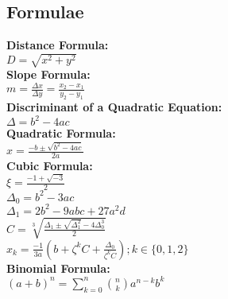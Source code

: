\documentclass[12pt]{article}
\begin{document}
\subsection*{Formulae}
\textbf{Distance Formula:}
    \\ \( D = \sqrt{ x^2 + y^2 } \)
\\ \textbf{Slope Formula:}
    \\ \( m = \displaystyle\frac{ \Delta x }{ \Delta y } = \displaystyle\frac{ x_2 - x_1 }{ y_2 - y_1 } \)
\\ \textbf{Discriminant of a Quadratic Equation:}
    \\ \( \Delta = b^2 - 4ac \)
\\ \textbf{Quadratic Formula:}
    \\ \( x = \displaystyle\frac{ -b \pm \sqrt{ b^2 - 4ac } }{ 2a } \)
\\ \textbf{Cubic Formula:}
    \\ \( \xi = \displaystyle\frac{ -1 + \sqrt{ -3 } }{ 2 } \)
    \\ \( \Delta_0 = b^2 - 3ac  \)
    \\ \( \Delta_1 = 2b^2 - 9abc + 27 a^2 d \)
    \\ \( C = \sqrt[3]{ \displaystyle\frac{ \Delta_1 \pm \sqrt{ \Delta_1^2 } -4 \Delta_0^3 }{ 2 } } \)
    \\ \( x_k = \displaystyle\frac{ -1 }{ 3a } \left(  b + \zeta^kC + \displaystyle\frac{ \Delta_0 }{ \zeta^k C } \right) ; k \in \{ 0, 1, 2 \} \)
\\ \textbf{Binomial Formula:}
    \\ \( ( a + b )^n = \displaystyle\sum_{k = 0}^{n} { \binom{n}{k} a^{n - k} b^k } \)
\end{document}
